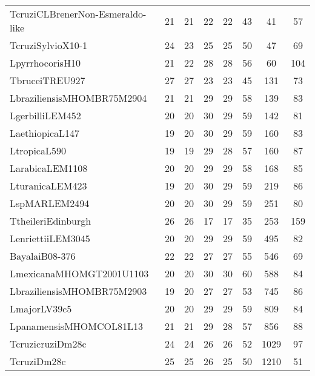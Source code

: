 \documentclass[table,
12pt, %
a4paper, %
oneside, %
headinclude,footinclude, %
BCOR5mm, %
]{scrartcl}
\begin{document}
\begin{table}[htbp]
\begin{adjustbox}{center}
\begin{tabular}{|l|ccccccc|}
      TcruziCLBrenerNon-Esmeraldo-like & 21  & 21  & 22  & 22  & 43   & 41    & 57     \\
      TcruziSylvioX10-1                & 24  & 23  & 25  & 25  & 50   & 47    & 69     \\
      LpyrrhocorisH10                  & 21  & 22  & 28  & 28  & 56   & 60    & 104    \\
      TbruceiTREU927                   & 27  & 27  & 23  & 23  & 45   & 131   & 73     \\
      LbraziliensisMHOMBR75M2904       & 21  & 21  & 29  & 29  & 58   & 139   & 83     \\
      LgerbilliLEM452                  & 20  & 20  & 30  & 29  & 59   & 142   & 81     \\
      LaethiopicaL147                  & 19  & 20  & 30  & 29  & 59   & 160   & 83     \\
      LtropicaL590                     & 19  & 19  & 29  & 28  & 57   & 160   & 87     \\
      LarabicaLEM1108                  & 20  & 20  & 29  & 29  & 58   & 168   & 85     \\
      LturanicaLEM423                  & 19  & 20  & 30  & 29  & 59   & 219   & 86     \\
      LspMARLEM2494                    & 20  & 20  & 30  & 29  & 59   & 251   & 80     \\
      TtheileriEdinburgh               & 26  & 26  & 17  & 17  & 35   & 253   & 159    \\
      LenriettiiLEM3045                & 20  & 20  & 29  & 29  & 59   & 495   & 82     \\
      BayalaiB08-376                   & 22  & 22  & 27  & 27  & 55   & 546   & 69     \\
      LmexicanaMHOMGT2001U1103         & 20  & 20  & 30  & 30  & 60   & 588   & 84     \\
      LbraziliensisMHOMBR75M2903       & 19  & 20  & 27  & 27  & 53   & 745   & 86     \\
      LmajorLV39c5                     & 20  & 20  & 29  & 29  & 59   & 809   & 84     \\
      LpanamensisMHOMCOL81L13          & 21  & 21  & 29  & 28  & 57   & 856   & 88     \\
      TcruzicruziDm28c                 & 24  & 24  & 26  & 26  & 52   & 1029  & 97     \\
      TcruziDm28c                      & 25  & 25  & 26  & 25  & 50   & 1210  & 51     \\

\end{tabular}
\end{adjustbox}
\end{table}
\end{document}
